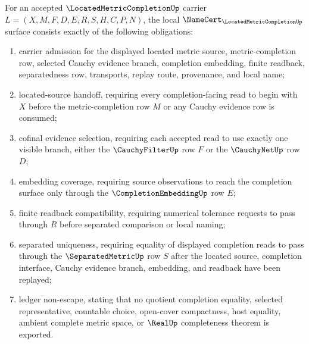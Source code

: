 \begin{theorem}
\label{thm:located-metric-completion-namecert-obligations}
For an accepted $\LocatedMetricCompletionUp$ carrier $L=(X,M,F,D,E,R,S,H,C,P,N)$, the local $\NameCert_{\LocatedMetricCompletionUp}$ surface consists exactly of the following obligations:
\begin{enumerate}
\item carrier admission for the displayed located metric source, metric-completion row, selected Cauchy evidence branch, completion embedding, finite readback, separatedness row, transports, replay route, provenance, and local name;
\item located-source handoff, requiring every completion-facing read to begin with $X$ before the metric-completion row $M$ or any Cauchy evidence row is consumed;
\item cofinal evidence selection, requiring each accepted read to use exactly one visible branch, either the $\CauchyFilterUp$ row $F$ or the $\CauchyNetUp$ row $D$;
\item embedding coverage, requiring source observations to reach the completion surface only through the $\CompletionEmbeddingUp$ row $E$;
\item finite readback compatibility, requiring numerical tolerance requests to pass through $R$ before separated comparison or local naming;
\item separated uniqueness, requiring equality of displayed completion reads to pass through the $\SeparatedMetricUp$ row $S$ after the located source, completion interface, Cauchy evidence branch, embedding, and readback have been replayed;
\item ledger non-escape, stating that no quotient completion equality, selected representative, countable choice, open-cover compactness, host equality, ambient complete metric space, or $\RealUp$ completeness theorem is exported.
\end{enumerate}
\end{theorem}
